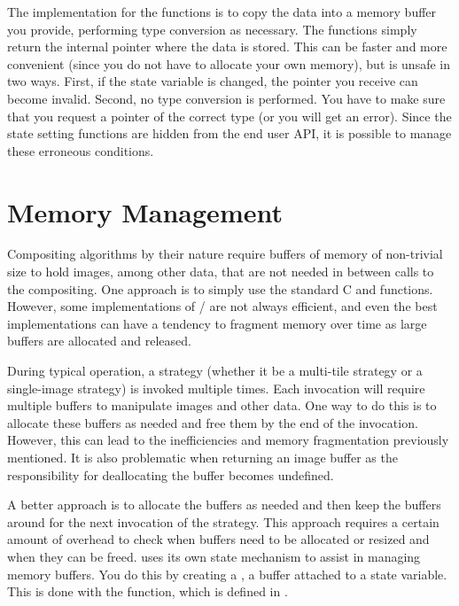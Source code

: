 The implementation for the  functions is to copy the data
into a memory buffer you provide, performing type conversion as necessary.
The  functions simply return the internal pointer
where the data is stored.  This can be faster and more convenient (since
you do not have to allocate your own memory), but is unsafe in two ways.
First, if the state variable is changed, the pointer you receive can become
invalid.  Second, no type conversion is performed.  You have to make sure
that you request a pointer of the correct type (or you will get an error).
Since the state setting functions are hidden from the end user API, it is
possible to manage these erroneous conditions.

\section{Memory Management}
\label{sec:New_Strategies:Memory_Management}

Compositing algorithms by their nature require buffers of memory of
non-trivial size to hold images, among other data, that are not needed in
between calls to the compositing.  One approach is to simply use the
standard C  and  functions.
However, some implementations of
/ are not always efficient, and
even the best implementations can have a tendency to fragment memory over
time as large buffers are allocated and released.

During typical \IceT operation, a strategy (whether it be a multi-tile
strategy or a single-image strategy) is invoked multiple times.  Each
invocation will require multiple buffers to manipulate images and other
data.  One way to do this is to allocate these buffers as needed and
free them by the end of the invocation.  However, this can lead to
the inefficiencies and memory fragmentation previously mentioned.  It is
also problematic when returning an image buffer as the responsibility for
deallocating the buffer becomes undefined.

A better approach is to allocate the buffers as needed and then keep the
buffers around for the next invocation of the strategy.  This approach
requires a certain amount of overhead to check when buffers need to be
allocated or resized and when they can be freed.  \IceT uses its own state
mechanism to assist in managing memory buffers.  You do this by creating a
, a buffer attached to a state
variable.  This is done with the  function, which
is defined in .

